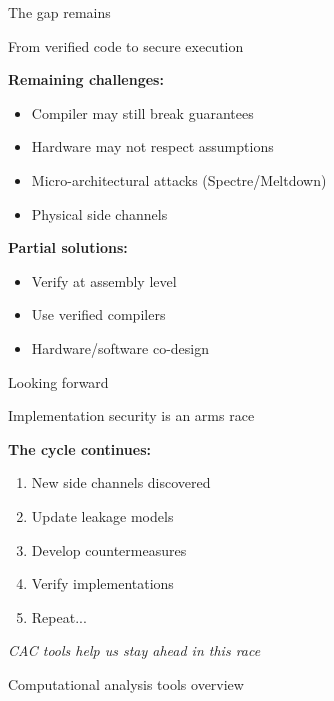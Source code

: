 \documentclass[aspectratio=169, lualatex, handout]{beamer}
\begin{document}
\begin{frame}{The gap remains}
	\begin{center}
		\Large
		From verified code to secure execution
	\end{center}
	\vspace{1em}
	\textbf{Remaining challenges:}
	\begin{itemize}
		\item Compiler may still break guarantees
		\item Hardware may not respect assumptions
		\item Micro-architectural attacks (Spectre/Meltdown)
		\item Physical side channels
	\end{itemize}
	\vspace{0.5em}
	\textbf{Partial solutions:}
	\begin{itemize}
		\item Verify at assembly level
		\item Use verified compilers
		\item Hardware/software co-design
	\end{itemize}
\end{frame}

\begin{frame}{Looking forward}
	\begin{center}
		\Large
		Implementation security is an arms race
	\end{center}
	\vspace{1em}
	\textbf{The cycle continues:}
	\begin{enumerate}
		\item New side channels discovered
		\item Update leakage models
		\item Develop countermeasures
		\item Verify implementations
		\item Repeat...
	\end{enumerate}
	\vspace{0.5em}
	\begin{center}
		\textit{CAC tools help us stay ahead in this race}
	\end{center}
\end{frame}

\begin{frame}{Computational analysis tools overview}
\end{frame}
\end{document}
